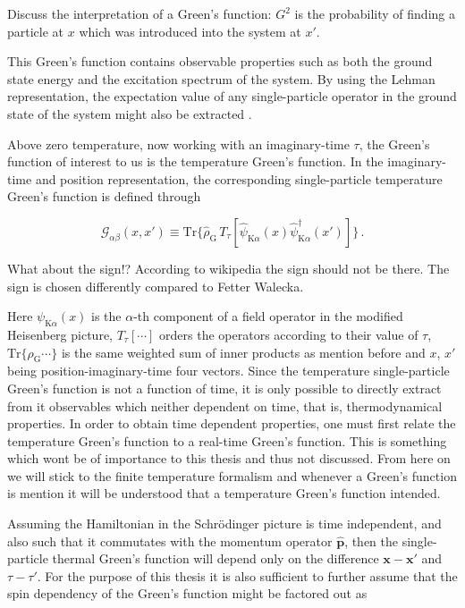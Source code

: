 \documentclass[12pt]{report}
\renewcommand{\vec}[1]{\boldsymbol{\mathbf{#1}}}                        %
\newcommand{\Gt}{\mathcal{G}}
\newcommand{\question}[1]{{\leavevmode\color{question}#1}}
\newcommand{\todo}[1]{{\leavevmode\color{todo}#1}}
\begin{document}
\todo{Discuss the interpretation of a Green's function: $ G^2 $ is the probability of finding a particle at $ x $ which was introduced into the system at $ x' $.}

This Green's function contains observable properties such as both the ground state energy and the excitation spectrum of the system.  By using the Lehman representation, the expectation value of any single-particle operator in the ground state of the system might also be extracted \cite{quantumTheoryOfManyParticleSystems}.

Above zero temperature, now working with an imaginary-time $ \tau $, the Green's function of interest to us is the temperature Green's function. In the imaginary-time and position representation, the corresponding single-particle temperature Green's function is defined through

\begin{equation}
	\Gt_{\alpha \beta} (x, x')
	\equiv \text{Tr} \{ \hat \rho_\text{G} \, T_\tau [\hat \psi_{\text{K} \alpha}(x) \hat \psi^\dagger_{\text{K} \alpha}(x') ] \} \,.
\end{equation}

\question{What about the sign!? According to wikipedia the sign should not be there. The sign is chosen differently compared to Fetter Walecka.}

Here $ \psi_{\text{K} \alpha}(x) $ is the $ \alpha $-th component of a field operator in the modified Heisenberg picture, $ T_\tau [\cdots] $ orders the operators according to their value of $ \tau $,  $ \text{Tr} \{ \rho_\text{G} \cdots \} $ is the same weighted sum of inner products as mention before and $ x $, $ x' $ being position-imaginary-time four vectors. Since the temperature single-particle Green's function is not a function of time, it is only possible to directly extract from it observables which neither dependent on time, that is, thermodynamical properties. In order to obtain time dependent properties, one must first relate the temperature Green's function to a real-time Green's function. This is something which wont be of importance to this thesis and thus not discussed. From here on we will stick to the finite temperature formalism and whenever a Green's function is mention it will be understood that a temperature Green's function intended.

Assuming the Hamiltonian in the Schrödinger picture is time independent, and also such that it commutates with the momentum operator $ \hat{ \vec p} $, then the single-particle thermal Green's function will depend only on the difference $ \vec x - \vec x' $ and $ \tau - \tau' $. For the purpose of this thesis it is also sufficient to further assume that the spin dependency of the Green's function might be factored out as
\end{document}
